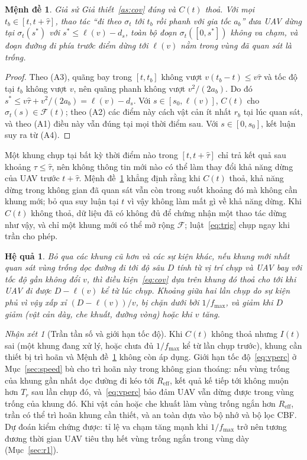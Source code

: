 \documentclass[11pt,a4paper]{article}
\theoremstyle{plain}
\newtheorem{proposition}{Mệnh đề}
\newtheorem{corollary}{Hệ quả}
\theoremstyle{definition}
\theoremstyle{remark}
\newtheorem{remark}{Nhận xét}
\newcommand{\fmax}{f_{\max}}
\newcommand{\tauh}{\hat{\tau}}
\newcommand{\Reff}{R_{\mathrm{eff}}}
\newcommand{\Fs}{\mathcal{F}}
\begin{document}
\begin{proposition}\label{prop:cov}
Giả sử Giả thiết~\ref{as:cov} đúng và $C(t)$ thoả. Với mọi $t_b \in [t, t+\tauh]$, thao tác ``đi theo $\sigma_t$ tới $t_b$ rồi phanh với gia tốc $a_b$'' đưa UAV dừng tại $\sigma_t(s^*)$ với $s^* \le \ell(v) - d_s$, toàn bộ đoạn $\sigma_t([0,s^*])$ không va chạm, và đoạn đường đi phía trước điểm dừng tới $\ell(v)$ nằm trong vùng đã quan sát là trống.
\end{proposition}

\begin{proof}
Theo (A3), quãng bay trong $[t, t_b]$ không vượt $v(t_b - t) \le v\tauh$ và tốc độ tại $t_b$ không vượt $v$, nên quãng phanh không vượt $v^2/(2a_b)$. Do đó $s^* \le v\tauh + v^2/(2a_b) = \ell(v) - d_s$. Với $s\in[s_0, \ell(v)]$, $C(t)$ cho $\sigma_t(s)\in\Fs(t)$; theo (A2) các điểm này cách vật cản ít nhất $r_b$ tại lúc quan sát, và theo (A1) điều này vẫn đúng tại mọi thời điểm sau. Với $s\in[0,s_0]$, kết luận suy ra từ (A4).
\end{proof}

Một khung chụp tại bất kỳ thời điểm nào trong $[t, t+\tauh]$ chỉ trả kết quả sau khoảng $\tau \le \tauh$, nên không thông tin mới nào có thể làm thay đổi khả năng dừng của UAV trước $t + \tauh$. Mệnh đề~\ref{prop:cov} khẳng định rằng khi $C(t)$ thoả, khả năng dừng trong không gian đã quan sát vẫn còn trong suốt khoảng đó mà không cần khung mới; bỏ qua suy luận tại $t$ vì vậy không làm mất gì về khả năng dừng. Khi $C(t)$ không thoả, dữ liệu đã có không đủ để chứng nhận một thao tác dừng như vậy, và chỉ một khung mới có thể mở rộng $\Fs$; luật~\eqref{eq:trig} chụp ngay khi trần cho phép.

\begin{corollary}\label{cor:rate}
Bỏ qua các khung cũ hơn và các sự kiện khác, nếu khung mới nhất quan sát vùng trống dọc đường đi tới độ sâu $D$ tính từ vị trí chụp và UAV bay với tốc độ gần không đổi $v$, thì điều kiện~\eqref{eq:cov} dựa trên khung đó thoả cho tới khi UAV đi được $D - \ell(v)$ kể từ lúc chụp. Khoảng giữa hai lần chụp do sự kiện phủ vì vậy xấp xỉ $(D - \ell(v))/v$, bị chặn dưới bởi $1/\fmax$, và giảm khi $D$ giảm (vật cản dày, che khuất, đường vòng) hoặc khi $v$ tăng.
\end{corollary}

\begin{remark}[Trần tần số và giới hạn tốc độ]\label{rem:cap}
Khi $C(t)$ không thoả nhưng $I(t)$ sai (một khung đang xử lý, hoặc chưa đủ $1/\fmax$ kể từ lần chụp trước), khung cần thiết bị trì hoãn và Mệnh đề~\ref{prop:cov} không còn áp dụng. Giới hạn tốc độ~\eqref{eq:vperc} ở Mục~\ref{sec:speed} bù cho trì hoãn này trong không gian thoáng: nếu vùng trống của khung gần nhất dọc đường đi kéo tới $\Reff$, kết quả kế tiếp tới không muộn hơn $T_r$ sau lần chụp đó, và~\eqref{eq:vperc} bảo đảm UAV vẫn dừng được trong vùng trống của khung đó. Khi vật cản hoặc che khuất làm vùng trống ngắn hơn $\Reff$, trần có thể trì hoãn khung cần thiết, và an toàn dựa vào bộ nhớ và bộ lọc CBF. Dự đoán kiểm chứng được: tỉ lệ va chạm tăng mạnh khi $1/\fmax$ trở nên tương đương thời gian UAV tiêu thụ hết vùng trống ngắn trong vùng dày (Mục~\ref{sec:r1}).
\end{remark}
\end{document}
